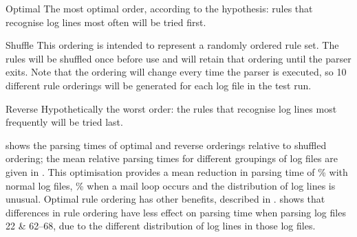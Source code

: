 \begin{eqlist}

    \item [Optimal]  The most optimal order, according to the hypothesis:
        rules that recognise log lines most often will be tried first.

    \item [Shuffle] This ordering is intended to represent a randomly
        ordered rule set.  The rules will be shuffled once before use and
        will retain that ordering until the parser exits.  Note that the
        ordering will change every time the parser is executed, so 10
        different rule orderings will be generated for each log file in the
        test run.

    \item [Reverse] Hypothetically the worst order: the rules that
        recognise log lines most frequently will be tried last.

\end{eqlist}

 shows the
parsing times of optimal and reverse orderings relative to shuffled
ordering; the mean relative parsing times for different groupings of log
files are given in .  This optimisation provides a mean reduction in parsing time of
\%
with normal log files,
\%
when a mail loop occurs and the distribution of log lines is unusual.
Optimal rule ordering has other benefits, described in
.   shows that differences in rule
ordering have less effect on parsing time when parsing log files 22 \&
62--68, due to the different distribution of log lines in those log files.




\FloatBarrier{}

